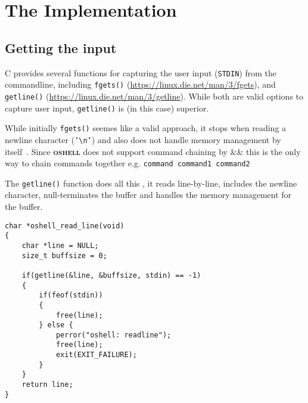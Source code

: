 \documentclass[12pt,english]{article}
\newcommand{\funcname}[1]{\texttt{#1()}\xspace} %
\newcommand{\projectname}{\textsc{oshell}}
\newcommand{\mycomment}[1]{}
\begin{document}
\lipsum[1]
\newline
{}
\lipsum[1]

\section{The Implementation}
\subsection{Getting the input}
C provides several functions for capturing
the user input (\texttt{STDIN}) from the commandline, including \funcname{fgets}
(\url{https://linux.die.net/man/3/fgets}), and
\funcname{getline} (\url{https://linux.die.net/man/3/getline}).
While both are valid options to capture user input, \funcname{getline} is (in this case) superior.

While initially \funcname{fgets} seemes like a valid
approach, it stops when reading a newline character
(\texttt{'\textbackslash n'})
and also does not handle memory management by itself~\cite{OS2023}.
Since \textbf{\projectname} does not support command chaining
by \&\& this is the only way to chain commands together e.g.
\texttt{command \n command1 \n command2}

The \funcname{getline} function does all this
, it reads line-by-line, includes the newline
character, null-terminates the buffer and
handles the memory management for the buffer.

\mycomment{
  Which is exactly what you want, because this means that the input handling is less prone to (memory) errors then it
would
be with any other input reading function.

}
\begin{verbatim}
char *oshell_read_line(void)
{
    char *line = NULL;
    size_t buffsize = 0;

    if(getline(&line, &buffsize, stdin) == -1)
    {
        if(feof(stdin))
        {
            free(line);
        } else {
            perror("oshell: readline");
            free(line);
            exit(EXIT_FAILURE);
        }
    }
    return line;
}
\end{verbatim}
\end{document}
